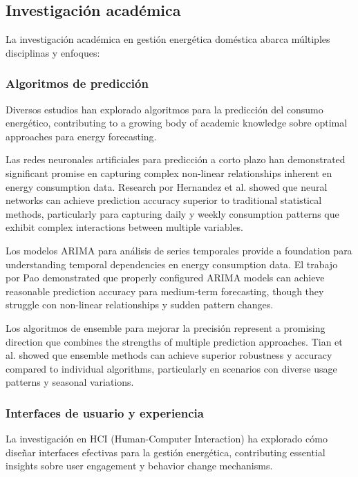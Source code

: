 \subsection{Investigación académica}

La investigación académica en gestión energética doméstica abarca múltiples disciplinas y enfoques:

\subsubsection{Algoritmos de predicción}

Diversos estudios han explorado algoritmos para la predicción del consumo energético, contributing to a growing body of academic knowledge sobre optimal approaches para energy forecasting.

Las redes neuronales artificiales para predicción a corto plazo han demonstrated significant promise en capturing complex non-linear relationships inherent en energy consumption data. Research por Hernandez et al. \cite{hernandez2013artificial} showed que neural networks can achieve prediction accuracy superior to traditional statistical methods, particularly para capturing daily y weekly consumption patterns que exhibit complex interactions between multiple variables.

Los modelos ARIMA para análisis de series temporales provide a foundation para understanding temporal dependencies en energy consumption data. El trabajo por Pao \cite{pao2006forecasting} demonstrated que properly configured ARIMA models can achieve reasonable prediction accuracy para medium-term forecasting, though they struggle con non-linear relationships y sudden pattern changes.

Los algoritmos de ensemble para mejorar la precisión represent a promising direction que combines the strengths of multiple prediction approaches. Tian et al. \cite{tian2018approach} showed que ensemble methods can achieve superior robustness y accuracy compared to individual algorithms, particularly en scenarios con diverse usage patterns y seasonal variations.

\subsubsection{Interfaces de usuario y experiencia}

La investigación en HCI (Human-Computer Interaction) ha explorado cómo diseñar interfaces efectivas para la gestión energética, contributing essential insights sobre user engagement y behavior change mechanisms.

